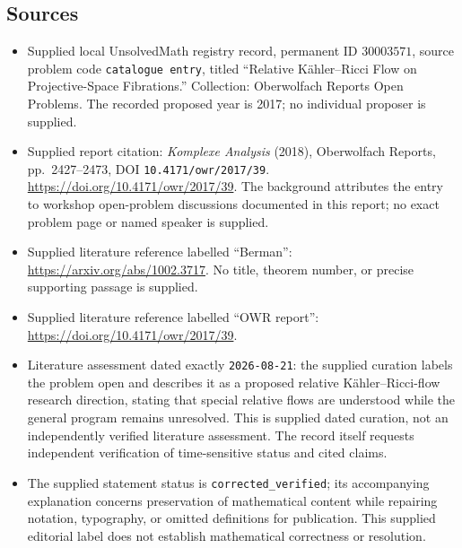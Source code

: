 \documentclass[11pt]{article}
\begin{document}
\subsection{Sources}
\begin{itemize}
\item Supplied local UnsolvedMath registry record, permanent ID \(30003571\), source problem code \texttt{catalogue entry}, titled ``Relative K\"ahler--Ricci Flow on Projective-Space Fibrations.'' Collection: Oberwolfach Reports Open Problems. The recorded proposed year is 2017; no individual proposer is supplied.
\item Supplied report citation: \emph{Komplexe Analysis} (2018), Oberwolfach Reports, pp.\ 2427--2473, DOI \texttt{10.4171/owr/2017/39}. \url{https://doi.org/10.4171/owr/2017/39}. The background attributes the entry to workshop open-problem discussions documented in this report; no exact problem page or named speaker is supplied.
\item Supplied literature reference labelled ``Berman'': \url{https://arxiv.org/abs/1002.3717}. No title, theorem number, or precise supporting passage is supplied.
\item Supplied literature reference labelled ``OWR report'': \url{https://doi.org/10.4171/owr/2017/39}.
\item Literature assessment dated exactly \texttt{2026-08-21}: the supplied curation labels the problem open and describes it as a proposed relative K\"ahler--Ricci-flow research direction, stating that special relative flows are understood while the general program remains unresolved. This is supplied dated curation, not an independently verified literature assessment. The record itself requests independent verification of time-sensitive status and cited claims.
\item The supplied statement status is \texttt{corrected\_verified}; its accompanying explanation concerns preservation of mathematical content while repairing notation, typography, or omitted definitions for publication. This supplied editorial label does not establish mathematical correctness or resolution.
\end{itemize}
\end{document}
